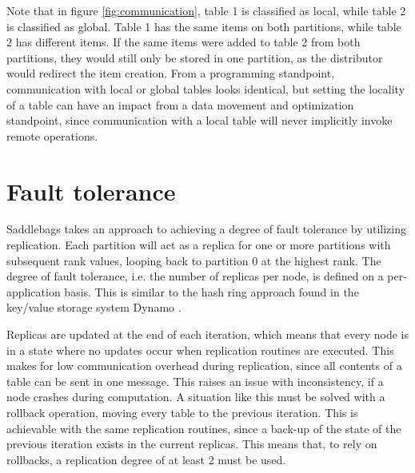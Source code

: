\documentclass{uit-report}
\begin{document}
Note that in figure \ref{fig:communication}, table 1 is classified as local, while table 2 is classified as global. Table 1 has the same items on both partitions, while table 2 has different items. If the same items were added to table 2 from both partitions, they would still only be stored in one partition, as the distributor would redirect the item creation. From a programming standpoint, communication with local or global tables looks identical, but setting the locality of a table can have an impact from a data movement and optimization standpoint, since communication with a local table will never implicitly invoke remote operations.




\section{Fault tolerance}
Saddlebags takes an approach to achieving a degree of fault tolerance by utilizing replication. Each partition will act as a replica for one or more partitions with subsequent rank values, looping back to partition 0 at the highest rank. The degree of fault tolerance, i.e. the number of replicas per node, is defined on a per-application basis. This is similar to the hash ring approach found in the key/value storage system Dynamo \cite{dynamo}.

Replicas are updated at the end of each iteration, which means that every node is in a state where no updates occur when replication routines are executed. This makes for low communication overhead during replication, since all contents of a table can be sent in one message. This raises an issue with inconsistency, if a node crashes during computation. A situation like this must be solved with a rollback operation, moving every table to the previous iteration. This is achievable with the same replication routines, since a back-up of the state of the previous iteration exists in the current replicas. This means that, to rely on rollbacks, a replication degree of at least 2 must be used. 
\end{document}
